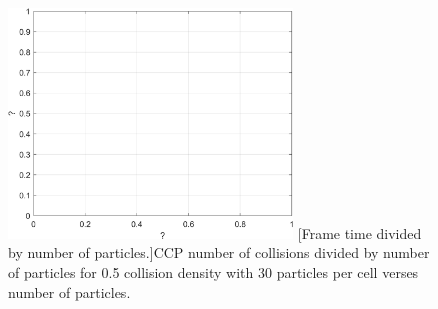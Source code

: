 \begin{figure}[h]
\centering
\includegraphics[width=2.97in]{../plots/Perf_VCUBE041.png}
[Frame time divided by number of particles.]{CCP number of collisions divided by number of particles for 0.5 collision density with 30 particles per cell verses number of particles.}
\label{fig:Perf_VCUBE04}
\end{figure}
